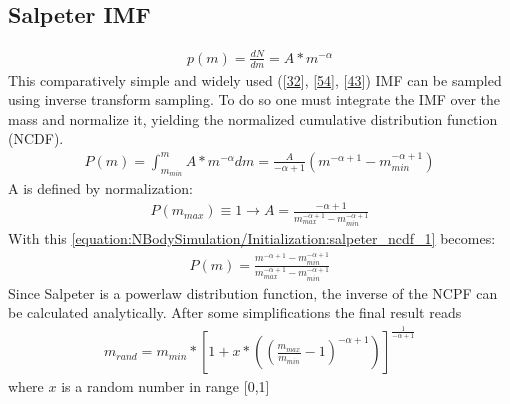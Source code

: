 \documentclass[letterpaper,10pt,english]{sphinxmanual}
\begin{document}
		
			\subsection{Salpeter IMF}
				\label{\detokenize{NBodySimulation/Initialization:salpeter-imf}}\begin{equation}\label{equation:NBodySimulation/Initialization:salpeter}
				\begin{split}p(m)=\frac{dN}{dm}=A*m^{-\alpha }\end{split}
				\end{equation}
				\sphinxAtStartPar
				This comparatively simple and widely used ({[}\hyperlink{cite.NBodySimulation/Appendix:id46}{32}{]}, {[}\hyperlink{cite.NBodySimulation/Appendix:id47}{54}{]}, {[}\hyperlink{cite.NBodySimulation/Appendix:id48}{43}{]}) IMF can be sampled using inverse transform sampling.
				To do so one must integrate the IMF over the mass and normalize it, yielding the normalized cumulative distribution function (NCDF).
				\begin{equation}\label{equation:NBodySimulation/Initialization:salpeter_ncdf_1}
				\begin{split}P(m)=\int_{m_{min}}^{m}A*m^{-\alpha } dm = \frac{A}{-\alpha +1}\left ( m^{-\alpha +1} -m_{min}^{-\alpha +1}\right )\end{split}
				\end{equation}
				\sphinxAtStartPar
				A is defined by normalization:
				\begin{equation*}
				\begin{split}P({m_{max}})\equiv 1\rightarrow A=\frac{-\alpha +1}{m_{max}^{-\alpha +1} -m_{min}^{-\alpha +1} }\end{split}
				\end{equation*}
				\sphinxAtStartPar
				With this \eqref{equation:NBodySimulation/Initialization:salpeter_ncdf_1} becomes:
				\begin{equation*}
				\begin{split}P(m)=\frac{m^{-\alpha +1} -m_{min}^{-\alpha +1}}{m_{max}^{-\alpha +1} -m_{min}^{-\alpha +1}}\end{split}
				\end{equation*}
				\sphinxAtStartPar
				Since Salpeter is a power\sphinxhyphen{}law distribution function, the inverse of the NCPF can be calculated analytically. After some simplifications the final result reads
				\begin{equation*}
				\begin{split}m_{rand} = m_{min}*\left [ 1+x*\left ( \left ( \frac{m_{max}}{m_{min}} -1\right )^{-\alpha +1} \right ) \right ]^{\frac{1}{-\alpha +1}}\end{split}
				\end{equation*}
				\sphinxAtStartPar
				where \(x\) is a random number in range {[}0,1{]}
				
\end{document}
